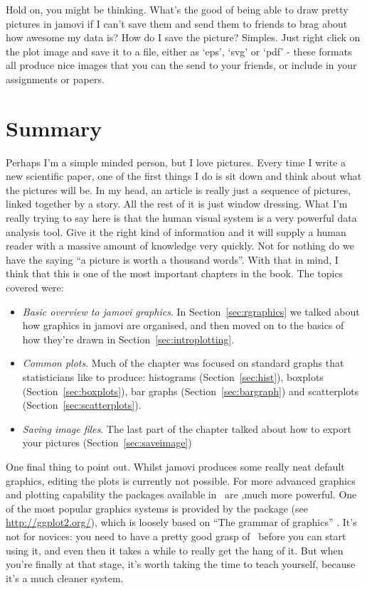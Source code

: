 Hold on, you might be thinking. What's the good of being able to draw pretty pictures in jamovi if I can't save them and send them to friends to brag about how awesome my data is? How do I save the picture? Simples. Just right click on the plot image and save it to a file, either as `eps', `svg' or `pdf' - these formats all produce nice images that you can the send to your friends, or include in your assignments or papers.


\section{Summary}

Perhaps I'm a simple minded person, but I love pictures. Every time I write a new scientific paper, one of the first things I do is sit down and think about what the pictures will be. In my head, an article is really just a sequence of pictures, linked together by a story. All the rest of it is just window dressing. What I'm really trying to say here is that the human visual system is a very powerful data analysis tool. Give it the right kind of information and it will supply a human reader with a massive amount of knowledge very quickly. Not for nothing do we have the saying ``a picture is worth a thousand words''. With that in mind, I think that this is one of the most important chapters in the book. The topics covered were:

\begin{itemize}
\item {\it Basic overview to jamovi graphics}. In Section~\ref{sec:rgraphics} we talked about how graphics in jamovi are organised, and then moved on to the basics of how they're drawn in Section~\ref{sec:introplotting}.
\item {\it Common plots}. Much of the chapter was focused on standard graphs that statisticians like to produce: histograms (Section~\ref{sec:hist}), boxplots (Section~\ref{sec:boxplots}), bar graphs (Section~\ref{sec:bargraph}) and scatterplots (Section~\ref{sec:scatterplots}). 
\item {\it Saving image files}. The last part of the chapter talked about how to export your pictures (Section~\ref{sec:saveimage})
\end{itemize} 

\noindent
One final thing to point out. Whilst jamovi produces some really neat default graphics, editing the plots is currently not possible. For more advanced graphics and plotting capability the packages available in \R\ are ,much more powerful. One of the most popular graphics systems is provided by the  package (see \url{http://ggplot2.org/}), which is loosely based on ``The grammar of graphics'' \cite{Wilkinson2006}. It's not for novices: you need to have a pretty good grasp of \R\ before you can start using it, and even then it takes a while to really get the hang of it. But when you're finally at that stage, it's worth taking the time to teach yourself, because it's a much cleaner system.





